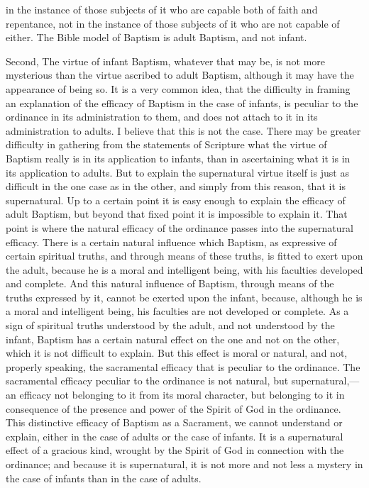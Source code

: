 \documentclass[english,]{book}
\begin{document}
in the instance of those subjects of it who are capable both of faith and repentance, not in the instance of those subjects of it who are not capable of either. The Bible model of Baptism is adult Baptism, and not infant.

Second, The virtue of infant Baptism, whatever that may be, is not more mysterious than the virtue ascribed to adult Baptism, although it may have the appearance of being so. It is a very common idea, that the difficulty in framing an explanation of the efficacy of Baptism in the case of infants, is peculiar to the ordinance in its administration to them, and does not attach to it in its administration to adults. I believe that this is not the case. There may be greater difficulty in gathering from the statements of Scripture what the virtue of Baptism really is in its application to infants, than in ascertaining what it is in its application to adults. But to explain the supernatural virtue itself is just as difficult in the one case as in the other, and simply from this reason, that it is supernatural. Up to a certain point it is easy enough to explain the efficacy of adult Baptism, but beyond that fixed point it is impossible to explain it. That point is where the natural efficacy of the ordinance passes into the supernatural efficacy. There is a certain natural influence which Baptism, as expressive of certain spiritual truths, and through means of these truths, is fitted to exert upon the adult, because he is a moral and intelligent being, with his faculties developed and complete. And this natural influence of Baptism, through means of the truths expressed by it, cannot be exerted upon the infant, because, although he is a moral and intelligent being, his faculties are not developed or complete. As a sign of spiritual truths understood by the adult, and not understood by the infant, Baptism has a certain natural effect on the one and not on the other, which it is not difficult to explain. But this effect is moral or natural, and not, properly speaking, the sacramental efficacy that is peculiar to the ordinance. The sacramental efficacy peculiar to the ordinance is not natural, but supernatural,---an efficacy not belonging to it from its moral character, but belonging to it in consequence of the presence and power of the Spirit of God in the ordinance. This distinctive efficacy of Baptism as a Sacrament, we cannot understand or explain, either in the case of adults or the case of infants. It is a supernatural effect of a gracious kind, wrought by the Spirit of God in connection with the ordinance; and because it is supernatural, it is not more and not less a mystery in the case of infants than in the case of adults.
\end{document}
